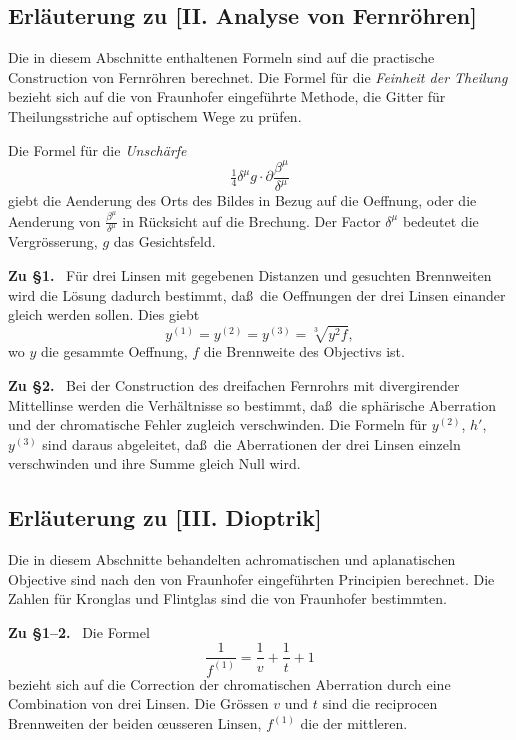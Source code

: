 \documentclass[12pt,a4paper]{article}
\theoremstyle{plain}
\theoremstyle{definition}
\theoremstyle{remark}
\begin{document}
\subsection*{Erl\"auterung zu [II. Analyse von Fernr\"ohren]}

Die in diesem Abschnitte enthaltenen Formeln sind auf die
practische Construction von Fernr\"ohren berechnet. Die Formel f\"ur
die \textit{Feinheit der Theilung} bezieht sich auf die von
{\sc Fraunhofer} eingef\"uhrte Methode, die Gitter f\"ur
Theilungsstriche auf optischem Wege zu pr\"ufen.

Die Formel f\"ur die \textit{Unsch\"arfe}
\[
\tfrac{1}{4}\delta^{\mu}g\cdot\partial\frac{\beta^{\mu}}{\delta^{\mu}}
\]
giebt die Aenderung des Orts des Bildes in Bezug auf die Oeffnung,
oder die Aenderung von $\frac{\beta^{\mu}}{\delta^{\mu}}$ in R\"ucksicht
auf die Brechung. Der Factor $\delta^{\mu}$ bedeutet die
Vergr\"osserung, $g$ das Gesichtsfeld.

\textbf{Zu \S 1.} \ F\"ur drei Linsen mit gegebenen Distanzen und
gesuchten Brennweiten wird die L\"osung dadurch bestimmt, da\ss\ die
Oeffnungen der drei Linsen einander gleich werden sollen. Dies giebt
\[
y^{(1)} = y^{(2)} = y^{(3)} = \sqrt[3]{y^{2}f},
\]
wo $y$ die gesammte Oeffnung, $f$ die Brennweite des Objectivs ist.

\textbf{Zu \S 2.} \ Bei der Construction des dreifachen Fernrohrs
mit divergirender Mittellinse werden die Verh\"altnisse so bestimmt,
da\ss\ die sph\"arische Aberration und der chromatische Fehler
zugleich verschwinden. Die Formeln f\"ur $y^{(2)}$, $h'$,
$y^{(3)}$ sind daraus abgeleitet, da\ss\ die Aberrationen der drei
Linsen einzeln verschwinden und ihre Summe gleich Null wird.

\subsection*{Erl\"auterung zu [III. Dioptrik]}

Die in diesem Abschnitte behandelten achromatischen und
aplanatischen Objective sind nach den von {\sc Fraunhofer}
eingef\"uhrten Principien berechnet. Die Zahlen f\"ur Kronglas und
Flintglas sind die von {\sc Fraunhofer} bestimmten.

\textbf{Zu \S 1--2.} \ Die Formel
\[
\frac{1}{f^{(1)}} = \frac{1}{v} + \frac{1}{t} + 1
\]
bezieht sich auf die Correction der chromatischen Aberration durch
eine Combination von drei Linsen. Die Gr\"ossen $v$ und $t$ sind die
reciprocen Brennweiten der beiden \oe usseren Linsen, $f^{(1)}$ die
der mittleren.
\end{document}
